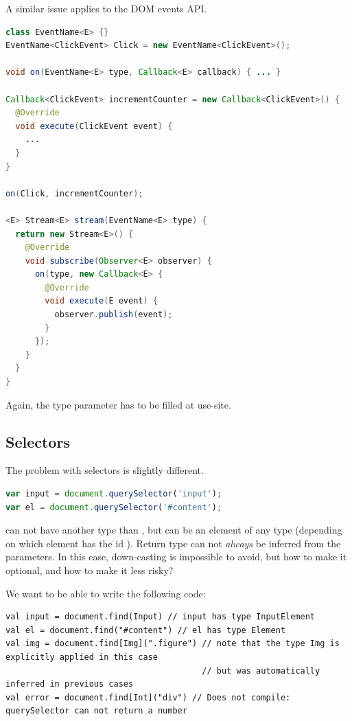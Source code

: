 \documentclass[runningheads,a4paper]{llncs}
\begin{document}
A similar issue applies to the DOM events API.

\begin{lstlisting}[language=Java]
class EventName<E> {}
EventName<ClickEvent> Click = new EventName<ClickEvent>();

void on(EventName<E> type, Callback<E> callback) { ... }

Callback<ClickEvent> incrementCounter = new Callback<ClickEvent>() {
  @Override
  void execute(ClickEvent event) {
    ...
  }
}

on(Click, incrementCounter);

<E> Stream<E> stream(EventName<E> type) {
  return new Stream<E>() {
    @Override
    void subscribe(Observer<E> observer) {
      on(type, new Callback<E> {
        @Override
        void execute(E event) {
          observer.publish(event);
        }
      });
    }
  }
}

\end{lstlisting}

Again, the type parameter  has to be filled at use-site.

\subsection{Selectors}

The problem with selectors is slightly different.

\begin{lstlisting}[language=JavaScript]
var input = document.querySelector('input');
var el = document.querySelector('#content');
\end{lstlisting}

 can not have another type than , but  can be an element of
any type (depending on which element has the id ). Return type can not \emph{always}
be inferred from the parameters. In this case, down-casting is impossible to avoid, but how to make
it optional, and how to make it less risky?

We want to be able to write the following code:

\begin{lstlisting}
val input = document.find(Input) // input has type InputElement
val el = document.find("#content") // el has type Element
val img = document.find[Img](".figure") // note that the type Img is explicitly applied in this case
                                        // but was automatically inferred in previous cases
val error = document.find[Int]("div") // Does not compile: querySelector can not return a number
\end{lstlisting}
\end{document}
